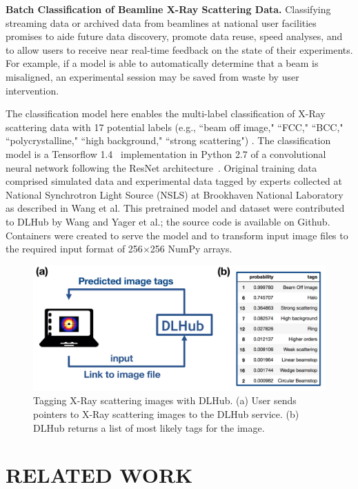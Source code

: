 \documentclass{aip-cp}
\begin{document}
\textbf{Batch Classification of Beamline X-Ray Scattering Data.}
Classifying streaming data or archived data from beamlines at national user
facilities promises to aide future data discovery, promote data reuse, speed
analyses, and to allow users to receive near real-time feedback on the state
of their experiments. For example, if a model is able to automatically
determine that a beam is misaligned, an experimental session may be saved from
waste by user intervention.

The classification model here enables the multi-label classification of X-Ray
scattering data with 17 potential labels (e.g., ``beam off image," ``FCC,"
``BCC," ``polycrystalline," ``high background," ``strong scattering") \cite{wang2017x}. The
classification model is a Tensorflow 1.4~\cite{abadi2016tensorflow} implementation in Python 2.7 of a
convolutional neural network following the ResNet architecture~\cite{resnet}. Original
training data comprised simulated data and experimental data tagged by experts
collected at National Synchrotron Light Source (NSLS) at Brookhaven National
Laboratory as described in Wang et al. This pretrained model and dataset were
contributed to DLHub by Wang and Yager et al.; the source code is available 
on Github\cite{wang2017xcode}. Containers were created to serve
the model and to transform input image files to the
required input format of 256$\times$256 NumPy arrays.

\begin{figure}[h]
  \centerline{\includegraphics[width=5in]{Figs/DLHub-BNL.png}}
  \caption{Tagging X-Ray scattering images with DLHub. 
  (a) User sends pointers to X-Ray scattering images to the DLHub service. 
  (b) DLHub returns a list of most likely tags for the image.
\label{fig:dlhub-bnl}}
\end{figure}

\section{RELATED WORK}
\end{document}
